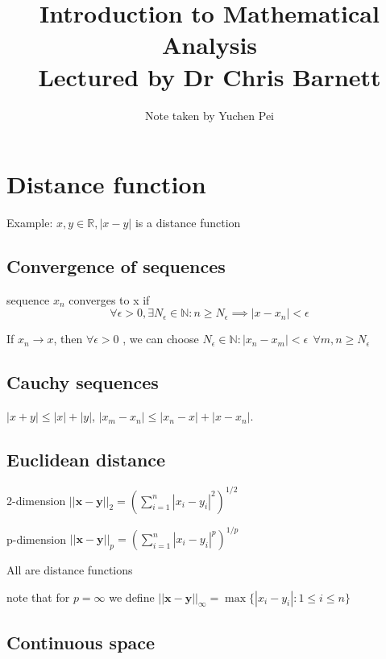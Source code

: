 

\title{Introduction to Mathematical Analysis\\{\small Lectured by Dr Chris Barnett}}
\author{Note taken by Yuchen Pei}
\date{}

\maketitle



\section{Distance function}

Example:
$x,y \in \mathbb{R}, |x-y|$ is a distance function


\subsection{Convergence of sequences}

sequence $x_n$ converges to x if
$$
\forall \epsilon>0, \exists N_\epsilon\in\mathbb{N}: n\geq N_\epsilon \implies |x-x_n|<\epsilon
$$

If $x_n\rightarrow x$, then $\forall \epsilon>0$ , we can choose $N_\epsilon \in \mathbb{N}: |x_n-x_m|<\epsilon \:\:\forall m,n\geq N_\epsilon$

\subsection{Cauchy sequences}

$|x+y|\leq |x|+|y|$, $|x_m-x_n|\leq|x_n-x|+|x-x_n|$.

\subsection{Euclidean distance}

2-dimension
$|| \mathbf{x}-\mathbf{y} ||_2=\left(\sum_{i=1}^{n}|x_i-y_i|^2\right)^{1/2}$

p-dimension
$|| \mathbf{x}-\mathbf{y} ||_p=\left(\sum_{i=1}^{n}|x_i-y_i|^p\right)^{1/p}$

All are distance functions

note that for $p=\infty$ we define $||\mathbf{x}-\mathbf{y}||_\infty=\max\{  |x_i-y_i|:1\leq i\leq n  \}$

\subsection{Continuous space}

